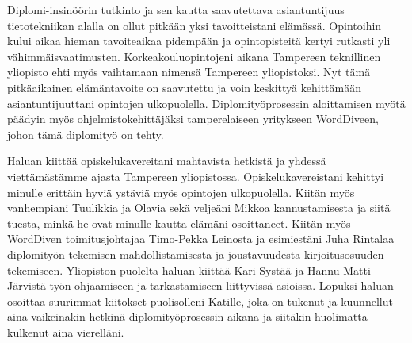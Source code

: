 Diplomi-insinöörin tutkinto ja sen kautta saavutettava asiantuntijuus tietotekniikan alalla on ollut pitkään yksi tavoitteistani elämässä.
Opintoihin kului aikaa hieman tavoiteaikaa pidempään ja opintopisteitä kertyi rutkasti yli vähimmäisvaatimusten.
Korkeakouluopintojeni aikana Tampereen teknillinen yliopisto ehti myös vaihtamaan nimensä Tampereen yliopistoksi.
Nyt tämä pitkäaikainen elämäntavoite on saavutettu ja voin keskittyä kehittämään asiantuntijuuttani opintojen ulkopuolella.
Diplomityöprosessin aloittamisen myötä päädyin myös ohjelmistokehittäjäksi tamperelaiseen yritykseen WordDiveen, johon tämä diplomityö on tehty.

Haluan kiittää opiskelukavereitani mahtavista hetkistä ja yhdessä viettämästämme ajasta Tampereen yliopistossa.
Opiskelukavereistani kehittyi minulle erittäin hyviä ystäviä myös opintojen ulkopuolella.
Kiitän myös vanhempiani Tuulikkia ja Olavia sekä veljeäni Mikkoa kannustamisesta ja siitä tuesta, minkä he ovat minulle kautta elämäni osoittaneet.
Kiitän myös WordDiven toimitusjohtajaa Timo-Pekka Leinosta ja esimiestäni Juha Rintalaa diplomityön tekemisen mahdollistamisesta ja joustavuudesta kirjoitusosuuden tekemiseen.
Yliopiston puolelta haluan kiittää Kari Systää ja Hannu-Matti Järvistä työn ohjaamiseen ja tarkastamiseen liittyvissä asioissa.
Lopuksi haluan osoittaa suurimmat kiitokset puolisolleni Katille, joka on tukenut ja kuunnellut aina vaikeinakin hetkinä diplomityöprosessin aikana ja siitäkin huolimatta kulkenut aina vierelläni.
